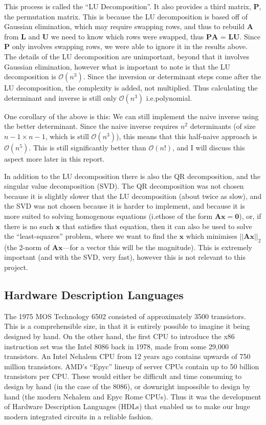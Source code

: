 \documentclass[12pt]{article}
\begin{document}
This process is called the ``LU Decomposition''\cite{lu_decomposition}. It also provides a third matrix, $\mathbf{P}$, the permutation matrix. This is because the LU decomposition is based off of Gaussian elimination, which may require swapping rows, and thus to rebuild $\mathbf{A}$ from $\mathbf{L}$ and $\mathbf{U}$ we need to know which rows were swapped, thus $\mathbf{PA}$ = $\mathbf{LU}$. Since $\mathbf{P}$ only involves swapping rows, we were able to ignore it in the results above. The details of the LU decomposition are unimportant, beyond that it involves Gaussian elimination, however what is important to note is that the LU decomposition is $\mathcal{O}(n^3)$. Since the inversion or determinant steps come after the LU decomposition, the complexity is added, not multiplied. Thus calculating the determinant and inverse is still only $\mathcal{O}(n^3)$ i.e.\@ polynomial.

One corollary of the above is this: We can still implement the naive inverse using the better determinant. Since the naive inverse requires $n^2$ determinants (of size $n-1 \times n-1$, which is still $\mathcal{O}(n^3)$), this means that this half-naive approach is $\mathcal{O}(n^5)$. This is still significantly better than $\mathcal{O}(n!)$, and I will discuss this aspect more later in this report.

In addition to the LU decomposition there is also the QR decomposition, and the singular value decomposition (SVD)\cite{num_lin_alg}. The QR decomposition was not chosen because it is slightly slower that the LU decomposition (about twice as slow), and the SVD was not chosen because it is harder to implement, and because it is more suited to solving homogenous equations (i.e\@ those of the form $\mathbf{A}\mathbf{x}=\mathbf{0}$), or, if there is no such $\mathbf{x}$ that satisfies that equation, then it can also be used to solve the ``least-squares'' problem, where we want to find the $\mathbf{x}$ which minimises $||\mathbf{Ax}||_2$ (the 2-norm of $\mathbf{Ax}$---for a vector this will be the magnitude). This is extremely important (and with the SVD, very fast), however this is not relevant to this project.

\subsection{Hardware Description Languages}

The 1975 MOS Technology 6502 consisted of approximately 3500 transistors. This is a comprehensible size, in that it is entirely possible to imagine it being designed by hand. On the other hand, the first CPU to introduce the x86 instruction set was the Intel 8086 back in 1978, made from some 29,000 transistors. An Intel Nehalem CPU from 12 years ago contains upwards of 750 million transistors. AMD's ``Epyc'' lineup of server CPUs contain up to 50 billion transistors per CPU. These would either be difficult and time consuming to design by hand (in the case of the 8086), or downright impossible to design by hand (the modern Nehalem and Epyc Rome CPUs). Thus it was the development of Hardware Description Languages (HDLs) that enabled us to make our huge modern integrated circuits in a reliable fashion.
\end{document}
